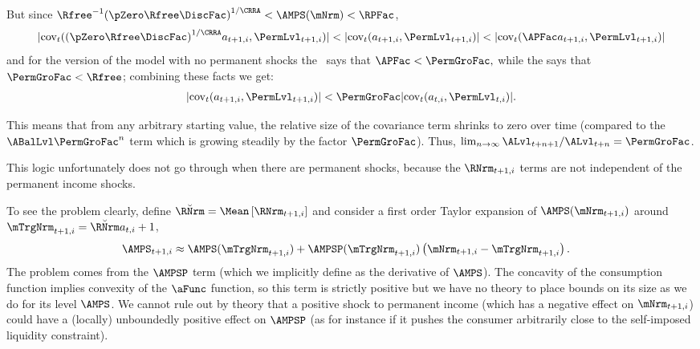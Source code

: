 \documentclass[\econtexRoot/BufferStockTheory]{subfiles}
\begin{document}
But since ${\Rfree}^{-1}{(\pZero  \Rfree\DiscFac)}^{1/\CRRA} < \AMPS(\mNrm) < \RPFac $,
\begin{equation}
  |\mbox{cov}_{t}({(\pZero  \Rfree\DiscFac)}^{1/\CRRA}a_{t+1,i},\PermLvl_{t+1,i})| <
  |\mbox{cov}_{t}(a_{t+1,i},\PermLvl_{t+1,i})| <
  |\mbox{cov}_{t}({\APFac}a_{t+1,i},\PermLvl_{t+1,i})| \nonumber
\end{equation}
and for the version of the model with no permanent shocks the \GICMod~says that ${\APFac} < \PermGroFac, $ while the {\FHWC} says that $\PermGroFac < \Rfree$; combining these facts we get:
\begin{equation}\begin{gathered}\begin{aligned}
  |\mbox{cov}_{t}(a_{t+1,i},\PermLvl_{t+1,i})| < \PermGroFac
  |\mbox{cov}_{t}(a_{t,i},\PermLvl_{t,i})|. \nonumber
\end{aligned}\end{gathered}\end{equation}

This means that from any arbitrary starting value, the relative size of the covariance term shrinks to zero over time (compared to the $\ABalLvl \PermGroFac^{n}$ term which is growing steadily by the factor $\PermGroFac$).  Thus, $\lim_{n \rightarrow \infty} \ALvl_{t+n+1}/\ALvl_{t+n} = \PermGroFac$.

This logic unfortunately does not go through when there are permanent shocks, because the $\RNrm _{t+1,i}$ terms are not independent of the permanent income shocks.

To see the problem clearly, define $\breve{\RNrm }=\Mean\left[\RNrm _{t+1,i}\right]$ and consider a first order Taylor expansion of $\AMPS(\mNrm_{t+1,i})$ around $\mTrgNrm_{t+1,i}=\breve{\RNrm } a_{t,i}+1$,
\begin{align*}
  \AMPS_{t+1,i} & \approx 
  \AMPS(\mTrgNrm_{t+1,i})+\AMPSP(\mTrgNrm_{t+1,i})\left(\mNrm_{t+1,i}-\mTrgNrm_{t+1,i}\right)
 \nonumber.
\end{align*}
The problem comes from the $\AMPSP$ term (which we implicitly define as the derivative of $\AMPS$).  The concavity of the consumption function implies convexity of the $\aFunc$ function, so this term is strictly positive but we have no theory to place bounds on its size as we do for its level $\AMPS$.  We cannot rule out by theory that a positive shock to permanent income (which has a negative effect on $\mNrm_{t+1,i}$) could have a (locally) unboundedly positive effect on $\AMPSP$ (as for instance if it pushes the consumer arbitrarily close to the self-imposed liquidity constraint).
\end{document}
